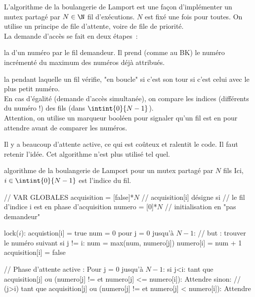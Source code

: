 \begin{adjustwidth}{-3cm}{-3cm}
L'algorithme de la boulangerie de Lamport est une façon d'implémenter un mutex partagé par $N\in \N$ fil d'exécutions. $N$ est fixé une fois pour toutes.
On utilise un principe de file d'attente, voire de file de priorité.\\
La demande d'accès se fait en deux étapes~:
\begin{enumeratebf}
    \item la  d'un numéro par le fil demandeur. Il prend (comme au BK) le numéro incrémenté du maximum des numéros déjà attribués.
    \item la  pendant laquelle un fil vérifie, "en boucle" si c'est son tour \ie si c'est celui avec le plus petit numéro.\\
    En cas d'égalité (demande d'accès simultanée), on compare les indices (différents du numéro !) des fils (dans $\intint{0}{N-1}$).\\
    Attention, on utilise un marqueur booléen pour signaler qu'un fil est en  pour attendre avant de comparer les numéros.
\end{enumeratebf}

\begin{remarque}{}{}
    Il y a beaucoup d'attente active, ce qui est coûteux et ralentit le code. Il faut retenir l'idée. Cet algorithme n'est plus utilisé tel quel.
\end{remarque}

\begin{implementation}{algorithme de la boulangerie de Lamport pour un mutex partagé par $N$ fils}
    Ici, $i \in \intint{0}{N-1}$ est l'indice du fil.
    \begin{lstLNat}
    // VAR GLOBALES
    acquisition = [false]*$N$ // acquisition[i] désigne si 
    // le fil d'indice i est en phase d'acquisition
    numero = [0]*$N$ // initialisation en "pas demandeur"

    lock($i$):
        acquistion[i] = true
        num = 0
        pour j = 0 jusqu'à $N-1$: // but : trouver le numéro suivant
            si j != i:
                num = max(num, numero[j])
        numero[i] = num + 1
        acquisition[i] = false

        // Phase d'attente active :
        Pour j = 0 jusqu'à $N-1$:
            si j<i:
                tant que acquisition[j] ou (numero[j] != et numero[j] <= numero[i]):
                    Attendre
            sinon: // (j>i)
                tant que acquisition[j] ou (numero[j] != et numero[j] < numero[i]):
                    Attendre
    

\end{lstLNat}
\end{implementation}
\end{adjustwidth}
